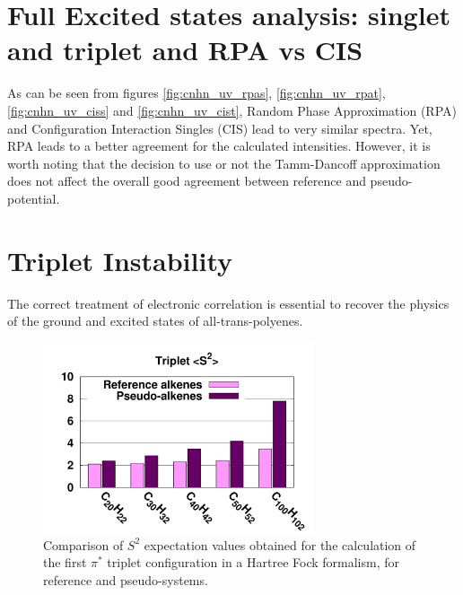 \documentclass[aip]{revtex4-1}
\begin{document}
\section*{Full Excited states analysis: singlet and triplet and RPA vs CIS}
As can be seen from figures \ref{fig:cnhn_uv_rpas}, \ref{fig:cnhn_uv_rpat},
\ref{fig:cnhn_uv_ciss} and \ref{fig:cnhn_uv_cist}, Random Phase Approximation (RPA)
and Configuration Interaction Singles (CIS) lead to very similar spectra.
Yet, RPA leads to a better agreement for the calculated intensities.
However, it is worth noting that the decision to use or not the Tamm-Dancoff approximation
does not affect the overall good agreement between reference and pseudo-potential.

\section*{Triplet Instability}
The correct treatment of electronic correlation is essential to recover the physics of the ground
and excited states of all-trans-polyenes.\cite{paldus_bond_1983, houk_polyacene_2001, colvin_energies_1998, castano_instabilities_1982, ukrainsky_electronic_1972, sokolov_time-dependent_2017, nakayama_theoretical_1998}

\begin{figure}
\begin{center}
\includegraphics[width=8cm]{long_pbe0_s2}
\end{center}
\caption{Comparison of $S^2$ expectation values obtained for the calculation
of the first $\pi^*$ triplet configuration in a Hartree Fock formalism, for reference
and pseudo-systems.}
\label{fig:ssquare}
\end{figure}
\end{document}
